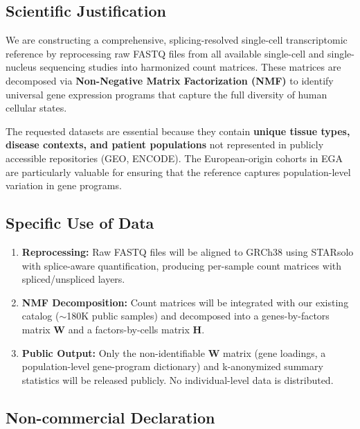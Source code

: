 \documentclass[11pt,a4paper]{article}
\begin{document}
\subsection{Scientific Justification}

We are constructing a comprehensive, splicing-resolved single-cell
transcriptomic reference by reprocessing raw FASTQ files from all
available single-cell and single-nucleus sequencing studies into
harmonized count matrices. These matrices are decomposed via
\textbf{Non-Negative Matrix Factorization (NMF)} to identify universal
gene expression programs that capture the full diversity of human
cellular states.

The requested datasets are essential because they contain
\textbf{unique tissue types, disease contexts, and patient populations}
not represented in publicly accessible repositories (GEO, ENCODE). The
European-origin cohorts in EGA are particularly valuable for ensuring
that the reference captures population-level variation in gene programs.

\subsection{Specific Use of Data}

\begin{enumerate}[nosep]
    \item \textbf{Reprocessing:} Raw FASTQ files will be aligned to
          GRCh38 using STARsolo with splice-aware quantification,
          producing per-sample count matrices with spliced/unspliced
          layers.

    \item \textbf{NMF Decomposition:} Count matrices will be integrated with
          our existing catalog ($\sim$180K public samples) and
          decomposed into a genes-by-factors matrix $\mathbf{W}$ and a
          factors-by-cells matrix $\mathbf{H}$.

    \item \textbf{Public Output:} Only the non-identifiable
          $\mathbf{W}$ matrix (gene loadings, a population-level
          gene-program dictionary) and k-anonymized summary statistics
          will be released publicly. No individual-level data is
          distributed.
\end{enumerate}

\subsection{Non-commercial Declaration}
\end{document}
